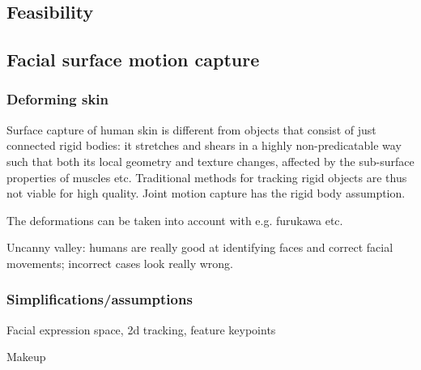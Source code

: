 




%
%
%



\subsection{Feasibility}

\subsection{Facial surface motion capture} %

\subsubsection{Deforming skin}

Surface capture of human skin is different from objects that consist of just connected rigid bodies: it stretches and shears in a highly non-predicatable way such that both its local geometry and texture changes, affected by the sub-surface properties of muscles etc.
Traditional methods for tracking rigid objects are thus not viable for high quality.
Joint motion capture has the rigid body assumption.

The deformations can be taken into account with e.g. furukawa etc.

Uncanny valley: humans are really good at identifying faces and correct facial movements; incorrect cases look really wrong.

\subsubsection{Simplifications/assumptions}

Facial expression space, 2d tracking, feature keypoints

Makeup

